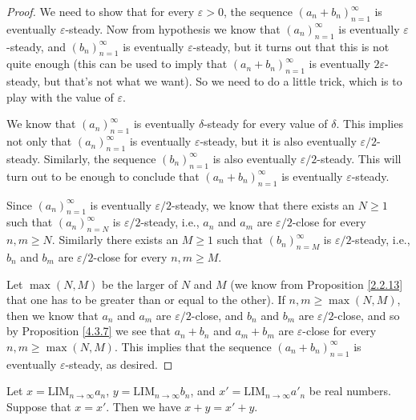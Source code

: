\begin{proof}
    We need to show that for every \(\varepsilon > 0\), the sequence \((a_n + b_n)_{n = 1}^{\infty}\) is eventually \(\varepsilon\)-steady.
    Now from hypothesis we know that \((a_n)_{n = 1}^{\infty}\) is eventually \(\varepsilon\)-steady, and \((b_n)_{n = 1}^{\infty}\) is eventually \(\varepsilon\)-steady, but it turns out that this is not quite enough
    (this can be used to imply that \((a_n + b_n)_{n = 1}^{\infty}\) is eventually \(2\varepsilon\)-steady, but that's not what we want).
    So we need to do a little trick, which is to play with the value of \(\varepsilon\).

    We know that \((a_n)_{n = 1}^{\infty}\) is eventually \(\delta\)-steady for every value of \(\delta\).
    This implies not only that \((a_n)_{n = 1}^{\infty}\) is eventually \(\varepsilon\)-steady, but it is also eventually \(\varepsilon / 2\)-steady.
    Similarly, the sequence \((b_n)_{n = 1}^{\infty}\) is also eventually \(\varepsilon / 2\)-steady.
    This will turn out to be enough to conclude that \((a_n + b_n)_{n = 1}^{\infty}\) is eventually \(\varepsilon\)-steady.

    Since \((a_n)_{n = 1}^{\infty}\) is eventually \(\varepsilon / 2\)-steady, we know that there exists an \(N \geq 1\) such that \((a_n)_{n = N}^{\infty}\) is \(\varepsilon / 2\)-steady, i.e., \(a_n\) and \(a_m\) are \(\varepsilon / 2\)-close for every \(n, m \geq N\).
    Similarly there exists an \(M \geq 1\) such that \((b_n)_{n = M}^{\infty}\) is \(\varepsilon / 2\)-steady, i.e., \(b_n\) and \(b_m\) are \(\varepsilon / 2\)-close for every \(n, m \geq M\).

    Let \(\max(N, M)\) be the larger of \(N\) and \(M\)
    (we know from Proposition \ref{2.2.13} that one has to be greater than or equal to the other).
    If \(n, m \geq \max(N, M)\), then we know that \(a_n\) and \(a_m\) are \(\varepsilon / 2\)-close, and \(b_n\) and \(b_m\) are \(\varepsilon / 2\)-close, and so by Proposition \ref{4.3.7} we see that \(a_n + b_n\) and \(a_m + b_m\) are \(\varepsilon\)-close for every \(n, m \geq \max(N, M)\).
    This implies that the sequence \((a_n + b_n)_{n = 1}^{\infty}\) is eventually \(\varepsilon\)-steady, as desired.
\end{proof}

\begin{lemma}\label{5.3.7}
    Let \(x = \text{LIM}_{n \to \infty} a_n\), \(y = \text{LIM}_{n \to \infty} b_n\), and \(x' = \text{LIM}_{n \to \infty} a'_n\) be real numbers.
    Suppose that \(x = x'\).
    Then we have \(x + y = x' + y\).
\end{lemma}

